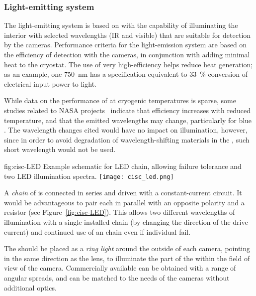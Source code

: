 \subsubsection{Light-emitting system}
The light-emitting system is based on  with the capability of illuminating the interior with selected
wavelengths (IR and visible) that are suitable for detection by the
cameras.  Performance criteria for the light-emission system are based
on the efficiency of detection with the cameras, in conjunction with
adding minimal heat to the cryostat. The use of very high-efficiency
helps reduce heat generation; as an
example, one \SI{750}{nm}  \cite{lumileds-DS144-pdf}
has a specification equivalent to
\SI{33}{\%} conversion of electrical input power to light.


While data on the performance of  at cryogenic temperatures is sparse,
some studies related to NASA projects~\cite{Carron:2017zzz} 
indicate that  efficiency increases with reduced temperature,
and that the emitted wavelengths may change, particularly for blue .
The wavelength changes cited would have no impact on illumination, however, since
in order  to avoid degradation of wavelength-shifting materials in the ,
such short wavelength  would not be used.

\begin{dunefigure}{fig:cisc-LED}
  {Example schematic for LED chain, allowing failure tolerance and two LED illumination spectra.}
  \texttt{[image: cisc\_led.png]}
\end{dunefigure}

A \textit{chain} of  is connected in series and driven with a
constant-current circuit. It would be advantageous to pair each
 in parallel with an opposite polarity  and a resistor
(see Figure~\ref{fig:cisc-LED}).
This allows two different wavelengths of illumination with a single installed
chain (by changing the direction of the drive current) and 
continued use of an  chain even if individual  fail.

The  should be placed as a \textit{ring light} around the outside of each
camera, pointing in the same direction as the lens, to 
illuminate the part of the  within the field of
view of the camera. Commercially available  can be obtained with
a range of angular spreads, and can be matched to the needs of the
cameras without additional optics.



